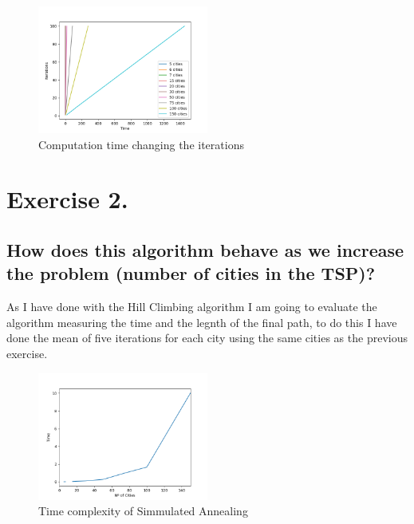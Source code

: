 \documentclass{article}
\begin{document}
        \begin{figure}[H]

            \centering
            \includegraphics[width=0.5\textwidth]{../media/03.TSP-iterative.png}
            \caption{Computation time changing the iterations}
            \label{Computation time changing the iterations}

        \end{figure}

    \newpage

    \section{Exercise 2.}

        \subsection{How does this algorithm behave as we increase the problem (number of cities in
    the TSP)?}

        As I have done with the Hill Climbing algorithm I am going to evaluate the algorithm measuring the time and the legnth of the final path, to do this I 
        have done the mean of five iterations for each city using the same cities as the previous exercise.

        \begin{figure}[H]

            \centering
            \includegraphics[width=0.5\textwidth]{../media/01.SimAnnealing-time.png}
            \caption{Time complexity of Simmulated Annealing}
            \label{Time complexity of Simmulated Annealing}

        \end{figure}
\end{document}
